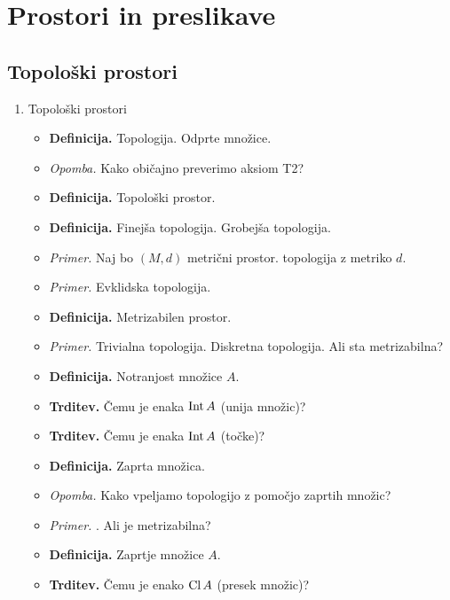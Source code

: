 \section{Prostori in preslikave}

\subsection{Topološki prostori}
\begin{enumerate}
    \item Topološki prostori
    \begin{itemize}
        \item \colorbox{purple!30}{\textbf{Definicija.}} Topologija. Odprte množice.
        \item \colorbox{yellow!30}{\emph{Opomba.}} Kako običajno preverimo aksiom T2?
        \item \colorbox{purple!30}{\textbf{Definicija.}} Topološki prostor.
        \item \colorbox{purple!30}{\textbf{Definicija.}} Finejša topologija. Grobejša topologija.         
        \item \colorbox{yellow!30}{\emph{Primer.}} Naj bo $(M, d)$ metrični prostor.  topologija z metriko $d$.
        \item \colorbox{yellow!30}{\emph{Primer.}} Evklidska topologija.
        \item \colorbox{purple!30}{\textbf{Definicija.}} Metrizabilen prostor.
        \item \colorbox{yellow!30}{\emph{Primer.}} Trivialna topologija. Diskretna topologija. Ali sta metrizabilna?
        \item \colorbox{purple!30}{\textbf{Definicija.}} Notranjost množice $A$.
        \item \colorbox{blue!30}{\textbf{Trditev.}} Čemu je enaka $\operatorname{Int} A$ (unija množic)?
        \item \colorbox{blue!30}{\textbf{Trditev.}} Čemu je enaka $\operatorname{Int} A$ (točke)?
        \item \colorbox{purple!30}{\textbf{Definicija.}} Zaprta množica.
        \item \colorbox{yellow!30}{\emph{Opomba.}} Kako vpeljamo topologijo z pomočjo zaprtih množic?
        \item \colorbox{yellow!30}{\emph{Primer.}} . Ali je metrizabilna?
        \item \colorbox{purple!30}{\textbf{Definicija.}} Zaprtje množice $A$.
        \item \colorbox{blue!30}{\textbf{Trditev.}} Čemu je enako $\operatorname{Cl} A$ (presek množic)?

\end{itemize}
\end{enumerate}
